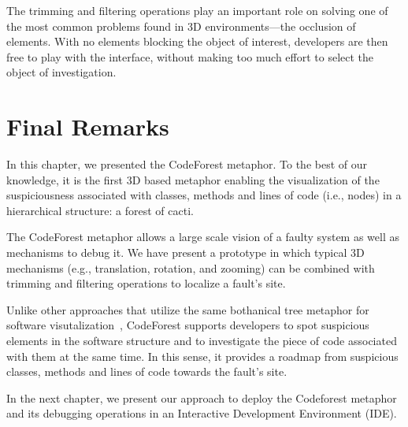 The trimming and filtering operations play an important role on solving one of
the most common problems found in 3D environments---the occlusion of elements.
With no elements blocking the object of interest, developers are then free to
play with the interface, without making too much effort to select the object of
investigation.

\section{Final Remarks}

In this chapter, we presented the CodeForest metaphor. To the best of our
knowledge, it is the first 3D based metaphor enabling the visualization of the
suspiciousness associated with classes, methods and lines of code (i.e., nodes)
in a hierarchical structure: a forest of cacti.

The CodeForest metaphor allows a large scale vision of a faulty system as well
as mechanisms to debug it. We have present a prototype in which typical 3D
mechanisms (e.g., translation, rotation, and zooming) can be combined with
trimming and filtering operations to localize a fault's site.

Unlike other approaches that utilize the same bothanical tree metaphor for
software visutalization~\cite{kleiberg2001botanical,erra2012towards}, CodeForest
supports developers to  spot suspicious elements in the software structure and
to investigate the piece of code associated with them at the same time. In this
sense, it provides a roadmap from suspicious classes, methods and lines of code
towards the fault's site.

In the next chapter, we present our approach to deploy the Codeforest metaphor
and its debugging operations in an Interactive Development Environment (IDE).